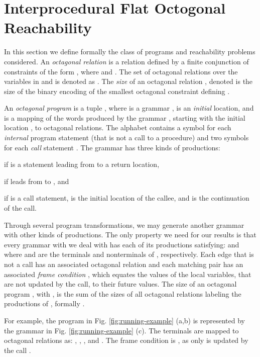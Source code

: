 \documentclass[final]{llncs}
\begin{document}
\section{Interprocedural Flat Octogonal Reachability}\label{sec:foreachpb}

In this section we define formally the class of programs and
reachability problems considered. An \emph{octagonal relation}
 is a relation defined 
by a finite conjunction of constraints of the form
, where  and 
. The set of octagonal relations over the variables in 
 and  is denoted as . 
The \emph{size} of an octagonal relation , denoted  is
the size of the binary encoding of the smallest octagonal constraint
defining .

An \emph{octagonal program} is a tuple
, where  is a grammar
,  is an \emph{initial} 
location, and  is a mapping of
the words produced by the grammar , starting with the initial
location , to octagonal relations.  The alphabet 
contains a symbol  for each \emph{internal} program statement
(that is not a call to a procedure) and two symbols  for each \emph{call} statement . The grammar 
has three kinds of productions: \begin{inparaenum}
\item  if  is a statement leading from  to a return location, 
\item  if  leads from  to , and 
\item  if  is a call statement, 
 is the initial location of the callee, and  is the continuation of the call.
\end{inparaenum}
Through several program transformations, we may generate another
grammar with other kinds of productions. 
The only property we need for our results is that every grammar 
with we deal with has each of its productions  satisfying:
 and 
where  and  are the terminals and nonterminals of , respectively.
Each edge  that is not a call has an associated octagonal
relation  and each matching
pair  has an associated \emph{frame
condition} , which equates
the values of the local variables, that are not updated by the call,
to their future values. The size of an octagonal program , with , is the
sum of the sizes of all octagonal relations labeling the productions
of , formally .

For example, the program in Fig. \ref{fig:running-example} (a,b) is
represented by the grammar in Fig. \ref{fig:running-example} (c).  The
terminals are mapped to octagonal relations
as: , , , 
and . The frame
condition is , as only  is
updated by the call .
\end{document}
